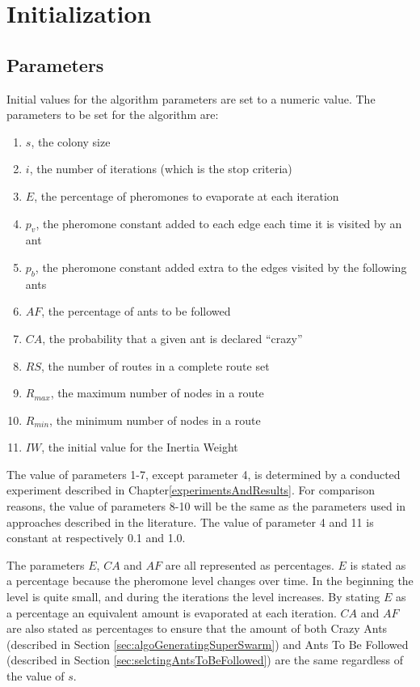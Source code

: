 \section{Initialization}
\label{sec:algoInitialization}
\subsection{Parameters}
Initial values for the algorithm parameters are set to a numeric value. The parameters to be set for the algorithm are:
\begin{enumerate}
\item $s$, the colony size
\item $i$, the number of iterations (which is the stop criteria)
\item $E$, the percentage of pheromones to evaporate at each iteration
\item $p_v$, the pheromone constant added to each edge each time it is visited by an ant
\item $p_b$, the pheromone constant added extra to the edges visited by the following ants 
\item $AF$, the percentage of ants to be followed
\item $CA$, the probability that a given ant is declared ``crazy''
\item $RS$, the number of routes in a complete route set 
\item $R_{max}$, the maximum number of nodes in a route
\item $R_{min}$, the minimum number of nodes in a route
\item $IW$, the initial value for the Inertia Weight
\end{enumerate}

The value of parameters 1-7, except parameter 4, is determined by a conducted experiment described in Chapter\vref{experimentsAndResults}. For comparison reasons, the value of parameters 8-10 will be the same as the parameters used in approaches described in the literature\citep{mandl79, kechagiopoulos14, nikolic14,kidwai98,fan10,chakroborty02,zhang10,chew12,baaj91, mumford13}. The value of parameter 4 and 11 is constant at respectively 0.1 and 1.0.

The parameters $E$, $CA$ and $AF$ are all represented as percentages. $E$ is stated as a percentage because the pheromone level changes over time. In the beginning the level is quite small, and during the iterations the level increases. By stating $E$ as a percentage an equivalent amount is evaporated at each iteration. $CA$ and $AF$ are also stated as percentages to ensure that the amount of both Crazy Ants (described in Section \vref{sec:algoGeneratingSuperSwarm}) and Ants To Be Followed (described in Section \vref{sec:selctingAntsToBeFollowed}) are the same regardless of the value of $s$. 


